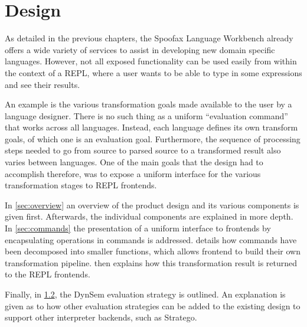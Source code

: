 \chapter{Design}
\label{cha:design}

As detailed in the previous chapters, the Spoofax Language Workbench already
offers a wide variety of services to assist in developing new domain specific
languages. However, not all exposed functionality can be used easily from within
the context of a REPL, where a user wants to be able to type in some expressions
and see their results.

An example is the various transformation goals made available to the user by a
language designer. There is no such thing as a uniform ``evaluation command''
that works across all languages. Instead, each language defines its own
transform goals, of which one is an evaluation goal.  Furthermore, the sequence
of processing steps needed to go from source to parsed source to a transformed
result also varies between languages. One of the main goals that the design had to
accomplish therefore, was to expose a uniform interface for the various
transformation stages to REPL frontends.

In \cref{sec:overview} an overview of the product design and its various
components is given first. Afterwards, the individual components are
explained in more depth. In \cref{sec:commands} the presentation of a uniform
interface to frontends by encapsulating operations in commands is addressed.
 details how commands have been
decomposed into smaller functions, which allows frontend to build their own
transformation pipeline.  then explains how this
transformation result is returned to the REPL frontends.

Finally, in \cref{sec:eval-strat}, the DynSem evaluation strategy is outlined. 
An explanation is given as to how other evaluation strategies
can be added to the existing design to support other interpreter backends,
such as Stratego.







\section{}
\label{sec:visitor}

\section{}
\label{sec:eval-strat}

